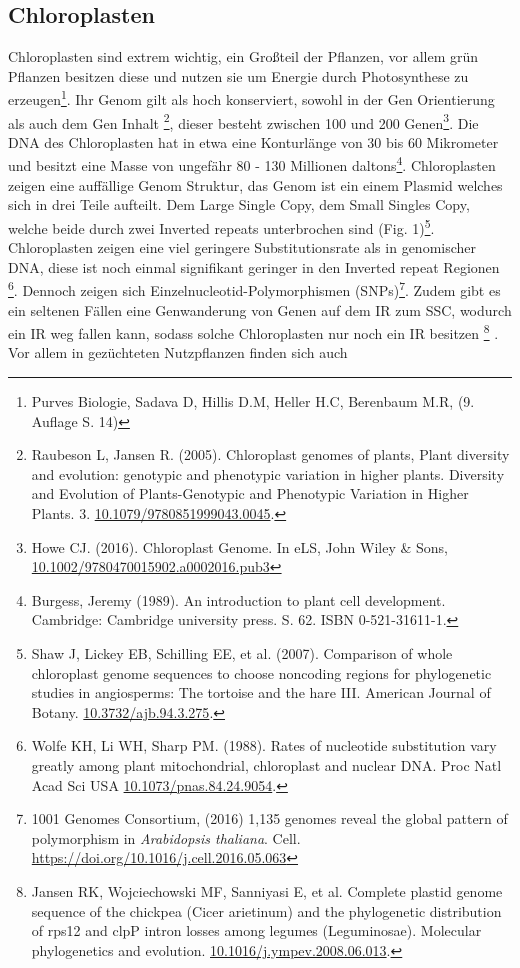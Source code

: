 \documentclass{scrartcl}
\begin{document}
\subsection{Chloroplasten}
\label{sec-2-1}
Chloroplasten sind extrem wichtig, ein Großteil der Pflanzen, vor allem grün Pflanzen besitzen diese und nutzen sie um Energie durch Photosynthese zu erzeugen\footnote{Purves Biologie, Sadava D, Hillis D.M, Heller H.C, Berenbaum M.R, (9. Auflage S. 14)}.
Ihr Genom gilt als hoch konserviert, sowohl in der Gen Orientierung als auch dem Gen Inhalt \footnote{Raubeson L, Jansen R. (2005). Chloroplast genomes of plants, Plant diversity and evolution: genotypic and phenotypic variation in higher plants. Diversity and Evolution of Plants-Genotypic and Phenotypic Variation in Higher Plants. 3. \url{10.1079/9780851999043.0045}.}, dieser besteht zwischen 100 und 200 Genen\footnote{Howe CJ. (2016). Chloroplast Genome. In eLS, John Wiley \& Sons,  \url{10.1002/9780470015902.a0002016.pub3}}. 
Die DNA des Chloroplasten hat in etwa eine Konturlänge von 30 bis 60 Mikrometer und besitzt eine Masse von ungefähr 80 - 130 Millionen daltons\footnote{Burgess, Jeremy (1989). An introduction to plant cell development. Cambridge: Cambridge university press. S. 62. ISBN 0-521-31611-1.}.
Chloroplasten zeigen
eine auffällige Genom Struktur, das Genom ist ein einem Plasmid welches sich in drei Teile aufteilt. Dem Large Single Copy, dem 
Small Singles Copy, welche beide durch zwei Inverted repeats unterbrochen sind (Fig. 1)\footnote{Shaw J, Lickey EB, Schilling EE, et al. (2007). Comparison of whole chloroplast genome sequences to choose noncoding regions for phylogenetic studies in angiosperms: The tortoise and the hare III. American Journal of Botany. \url{10.3732/ajb.94.3.275}.}. Chloroplasten zeigen eine viel geringere Substitutionsrate
als in genomischer DNA, diese ist noch einmal signifikant geringer in den Inverted repeat Regionen \footnote{Wolfe KH, Li WH, Sharp PM. (1988). Rates of nucleotide substitution vary greatly among plant mitochondrial, chloroplast and nuclear DNA. Proc Natl Acad Sci USA \url{10.1073/pnas.84.24.9054}.}. Dennoch zeigen sich
Einzelnucleotid-Polymorphismen (SNPs)\footnote{1001 Genomes Consortium, (2016) 1,135 genomes reveal the global pattern of polymorphism in \emph{Arabidopsis thaliana}. Cell. \url{https://doi.org/10.1016/j.cell.2016.05.063}}. Zudem gibt es ein seltenen Fällen eine Genwanderung von Genen auf dem IR zum SSC, wodurch ein IR weg
fallen kann, sodass solche Chloroplasten nur noch ein IR besitzen \footnote{Jansen RK, Wojciechowski MF, Sanniyasi E, et al. Complete plastid genome sequence of the chickpea (Cicer arietinum) and the phylogenetic distribution of rps12 and clpP intron losses among legumes (Leguminosae). Molecular phylogenetics and evolution. \url{10.1016/j.ympev.2008.06.013}.} . Vor allem in gezüchteten Nutzpflanzen finden sich auch 
\end{document}

